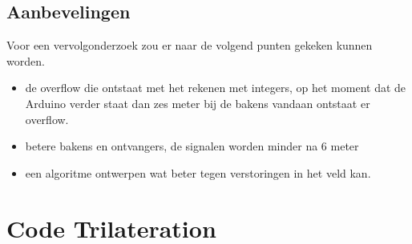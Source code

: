 \documentclass{article}
\begin{document}
\subsection{Aanbevelingen} 
 Voor een vervolgonderzoek zou er naar de volgend punten gekeken kunnen worden.
 \begin{itemize}
 	\item de overflow die ontstaat met het rekenen met integers, op het moment dat de Arduino verder staat dan zes meter bij de bakens vandaan ontstaat er overflow.
 	\item betere bakens en ontvangers, de signalen worden minder na 6 meter
 	\item een algoritme ontwerpen wat beter tegen verstoringen in het veld kan. 
 \end{itemize}
\newpage



\newpage
\appendix
{}
\section{Code Trilateration}
    \fontsize{8pt}{8pt}\selectfont

    \fontsize{10pt}{12pt}\selectfont
\newpage
\end{document}
